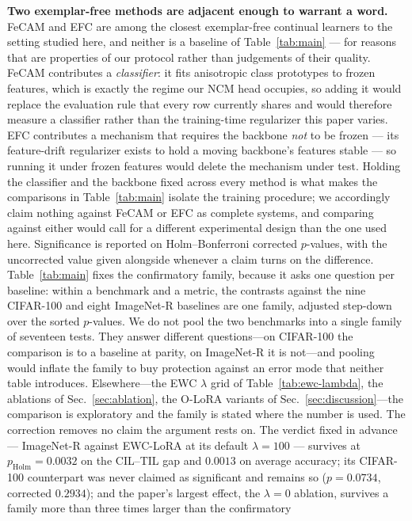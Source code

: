 \textbf{Two exemplar-free methods are adjacent enough to warrant a word.} FeCAM
\cite{goswami2023fecam} and EFC \cite{magistri2024efc} are among the closest exemplar-free
continual learners to the setting studied here, and neither is a baseline of
Table~\ref{tab:main} --- for reasons that are properties of our protocol rather than
judgements of their quality. FeCAM contributes a \emph{classifier}: it fits anisotropic
class prototypes to frozen features, which is exactly the regime our NCM head occupies, so
adding it would replace the evaluation rule that every row currently shares and would
therefore measure a classifier rather than the training-time regularizer this paper varies.
EFC contributes a mechanism that requires the backbone \emph{not} to be frozen --- its
feature-drift regularizer exists to hold a moving backbone's features stable --- so running
it under frozen features would delete the mechanism under test. Holding the classifier and
the backbone fixed across every method is what makes the comparisons in
Table~\ref{tab:main} isolate the training procedure; we accordingly claim nothing against
FeCAM or EFC as complete systems, and comparing against either would call for a different
experimental design than the one used here.
Significance is reported on Holm--Bonferroni corrected $p$-values, with the uncorrected
value given alongside whenever a claim turns on the difference. Table~\ref{tab:main} fixes
the confirmatory family, because it asks one question per baseline: within a benchmark and
a metric, the contrasts against the nine CIFAR-100 and eight ImageNet-R baselines are one
family, adjusted step-down over the sorted $p$-values. We do not pool the two benchmarks
into a single family of seventeen tests. They answer different questions---on CIFAR-100 the
comparison is to a baseline at parity, on ImageNet-R it is not---and pooling would inflate
the family to buy protection against an error mode that neither table introduces.
Elsewhere---the EWC $\lambda$ grid of Table~\ref{tab:ewc-lambda}, the ablations of
Sec.~\ref{sec:ablation}, the O-LoRA variants of Sec.~\ref{sec:discussion}---the comparison
is exploratory and the family is stated where the number is used. The correction removes no
claim the argument rests on. The verdict fixed in advance --- ImageNet-R against EWC-LoRA at
its default $\lambda{=}100$ --- survives at $p_{\mathrm{Holm}}=0.0032$ on the
CIL--TIL gap and
$0.0013$ on average accuracy; its CIFAR-100 counterpart was never claimed as significant and
remains so ($p=0.0734$, corrected $0.2934$); and the paper's largest effect, the
$\lambda{=}0$ ablation, survives a family more than three times larger than the confirmatory
